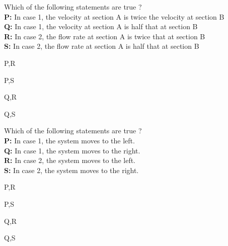 	\item Which of the following statements are true ?\\
		\textbf{P:} In case 1, the velocity at section A is twice the velocity at section B \\
		\textbf{Q:} In case 1, the velocity at section A is half that at section B\\
		\textbf{R:} In case 2, the flow rate at section A is twice that at section B \\
		\textbf{S:} In case 2, the flow rate at section A is half that at section B \\
		\begin{enumerate}
		\end{enumerate}
	\item Which of the following statements are true ? \\
		\textbf{P:} In case 1, the system moves to the left.\\
		\textbf{Q:} In case 1, the system moves to the right.\\
		\textbf{R:} In case 2, the system moves to the left.\\
		\textbf{S:} In case 2, the system moves to the right.
		\begin{enumerate}
				\begin{multicols}{4}
				\item P,R
				\item P,S
				\item Q,R
				\item Q,S
				\end{multicols}
		\end{enumerate}


